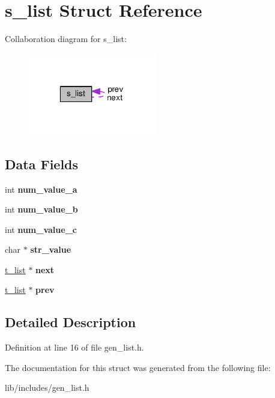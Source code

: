 \hypertarget{structs__list}{\section{s\-\_\-list Struct Reference}
\label{structs__list}
}


Collaboration diagram for s\-\_\-list\-:
\nopagebreak
\begin{figure}[H]
\begin{center}
\leavevmode
\includegraphics[width=159pt]{structs__list__coll__graph}
\end{center}
\end{figure}
\subsection*{Data Fields}
\begin{DoxyCompactItemize}
\item 
\hypertarget{structs__list_a08f6b479f237e672809735f0764104e6}{int {\bfseries num\-\_\-value\-\_\-a}}\label{structs__list_a08f6b479f237e672809735f0764104e6}

\item 
\hypertarget{structs__list_a067e0fca9eda0eeac39cd8c6e7fe50c5}{int {\bfseries num\-\_\-value\-\_\-b}}\label{structs__list_a067e0fca9eda0eeac39cd8c6e7fe50c5}

\item 
\hypertarget{structs__list_a6709d69fcc8bb060ac025b812ac45550}{int {\bfseries num\-\_\-value\-\_\-c}}\label{structs__list_a6709d69fcc8bb060ac025b812ac45550}

\item 
\hypertarget{structs__list_a50b6bdca20b777174be4fbdb217ca8d6}{char $\ast$ {\bfseries str\-\_\-value}}\label{structs__list_a50b6bdca20b777174be4fbdb217ca8d6}

\item 
\hypertarget{structs__list_afb31ca295a227d12dae42eb9d7a61f40}{\hyperlink{structs__list}{t\-\_\-list} $\ast$ {\bfseries next}}\label{structs__list_afb31ca295a227d12dae42eb9d7a61f40}

\item 
\hypertarget{structs__list_a58d5321b61e8202cbad3ede333207719}{\hyperlink{structs__list}{t\-\_\-list} $\ast$ {\bfseries prev}}\label{structs__list_a58d5321b61e8202cbad3ede333207719}

\end{DoxyCompactItemize}


\subsection{Detailed Description}


Definition at line 16 of file gen\-\_\-list.\-h.



The documentation for this struct was generated from the following file\-:\begin{DoxyCompactItemize}
\item 
lib/includes/gen\-\_\-list.\-h\end{DoxyCompactItemize}
